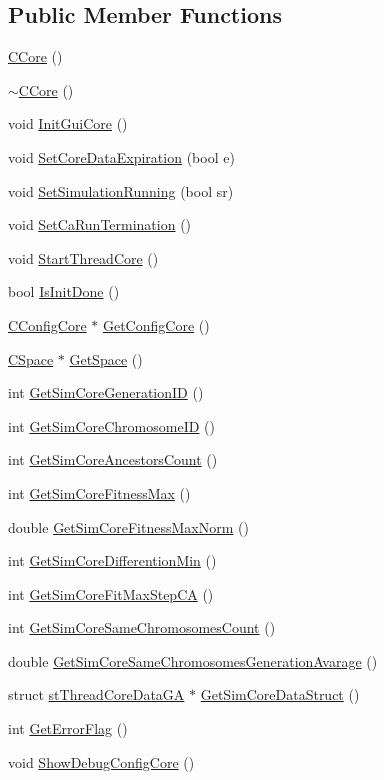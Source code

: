 \subsection*{Public Member Functions}
\begin{DoxyCompactItemize}
\item 
\hyperlink{classCCore_a4c7b83e9a0113f0d4eb0c1d86e6d6be7}{CCore} ()
\item 
\hyperlink{classCCore_ad0d1b93c70b1225137690ecb205d49bd}{$\sim$CCore} ()
\item 
void \hyperlink{classCCore_abf803abecd356eca5edff06f3ca6be33}{InitGuiCore} ()
\item 
void \hyperlink{classCCore_ae2e68df5908b34b15106820fde4d4de1}{SetCoreDataExpiration} (bool e)
\item 
void \hyperlink{classCCore_abe4809ea8ec654371e2a412ecbc057ee}{SetSimulationRunning} (bool sr)
\item 
void \hyperlink{classCCore_a799587561a1a236c5f62018fb9c7949e}{SetCaRunTermination} ()
\item 
void \hyperlink{classCCore_ab23cb1edf937f04342dfbbc7c2e1e45a}{StartThreadCore} ()
\item 
bool \hyperlink{classCCore_a9cc1459df131a2757809f13e2af2bf9e}{IsInitDone} ()
\item 
\hyperlink{classCConfigCore}{CConfigCore} $\ast$ \hyperlink{classCCore_a08ea111ccd738ddbc2d29ec3c9ac3443}{GetConfigCore} ()
\item 
\hyperlink{classCSpace}{CSpace} $\ast$ \hyperlink{classCCore_a3eebffde003b3ae3e724136521739e12}{GetSpace} ()
\item 
int \hyperlink{classCCore_a18ce09c76b45dd18a7932c4832f61300}{GetSimCoreGenerationID} ()
\item 
int \hyperlink{classCCore_acad2cd2c8de535f03515281b58c643a6}{GetSimCoreChromosomeID} ()
\item 
int \hyperlink{classCCore_ab1b7b2beb189d420eac4f2af40d883c2}{GetSimCoreAncestorsCount} ()
\item 
int \hyperlink{classCCore_a0de6196e934c38a12fd26875b5e020be}{GetSimCoreFitnessMax} ()
\item 
double \hyperlink{classCCore_a383218fe410dd8425ede9772277e708f}{GetSimCoreFitnessMaxNorm} ()
\item 
int \hyperlink{classCCore_a15daf074c713232f20f772b20098e716}{GetSimCoreDifferentionMin} ()
\item 
int \hyperlink{classCCore_a974f6f52d6cb6362718c7e1a06a767c9}{GetSimCoreFitMaxStepCA} ()
\item 
int \hyperlink{classCCore_a07b0206d4fc75b23bd8da7660d8efc1a}{GetSimCoreSameChromosomesCount} ()
\item 
double \hyperlink{classCCore_aa6634f29c320ed9110ce82eed156b05d}{GetSimCoreSameChromosomesGenerationAvarage} ()
\item 
struct \hyperlink{structstThreadCoreDataGA}{stThreadCoreDataGA} $\ast$ \hyperlink{classCCore_a4ddbbc5f50ff19b2d2b9095792b648a6}{GetSimCoreDataStruct} ()
\item 
int \hyperlink{classCCore_a86ddf9496601836d1dae7432279fd044}{GetErrorFlag} ()
\item 
void \hyperlink{classCCore_ae836cfc9a5b1d30a093cc92c7e0f825b}{ShowDebugConfigCore} ()
\end{DoxyCompactItemize}
